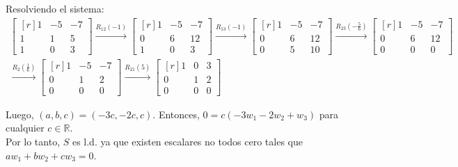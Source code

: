 \documentclass[11pt]{article}
\begin{document}
\begin{enumerate}
\begin{enumerate}
		Resolviendo el sistema:
		\begin{gather*}
		    \begin{bmatrix*}[r]
		        1 & -5 & -7 \\ 
		        1 & 1 & 5 \\ 
		        1 & 0 & 3
		    \end{bmatrix*} \xrightarrow{R_{12}(-1)} 
		    \begin{bmatrix*}[r]
		        1 & -5 & -7 \\ 
		        0 & 6 & 12 \\ 
		        1 & 0 & 3
		    \end{bmatrix*} \xrightarrow{R_{13}(-1)} 
		    \begin{bmatrix*}[r]
		        1 & -5 & -7 \\ 
		        0 & 6 & 12 \\ 
		        0 & 5 & 10
            \end{bmatrix*}  \xrightarrow{R_{23}(-\frac{5}{6})} 
		    \begin{bmatrix*}[r]
		        1 & -5 & -7 \\ 
		        0 & 6 & 12 \\ 
		        0 & 0 & 0
		    \end{bmatrix*} \\ \xrightarrow{R_2(\frac{1}{6})} 
		    \begin{bmatrix*}[r]
		        1 & -5 & -7 \\ 
		        0 & 1 & 2 \\ 
		        0 & 0 & 0
            \end{bmatrix*} \xrightarrow{R_{21}(5)} 
		    \begin{bmatrix*}[r]
		        1 & 0 & 3 \\ 
		        0 & 1 & 2 \\ 
		        0 & 0 & 0
            \end{bmatrix*}
		\end{gather*}
		
		Luego, $(a,b,c)=(-3c,-2c,c)$. Entonces, $0=c(-3w_1-2w_2+w_3)$ para cualquier $c \in \mathbb{R}$. \\
		Por lo tanto, $S$ es l.d. ya que existen escalares no todos cero tales que $aw_1 + bw_2 + cw_3 = 0$.
	\end{enumerate}


\end{enumerate}
\end{document}

